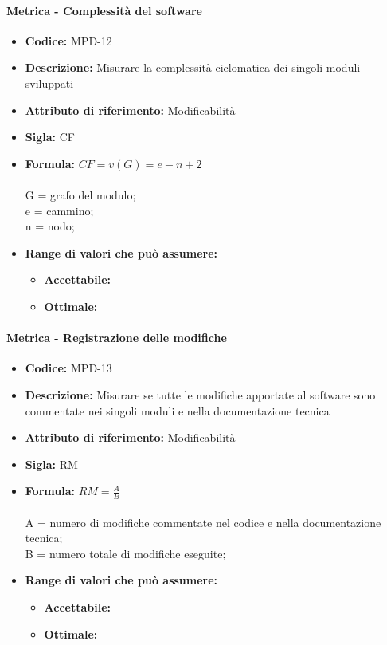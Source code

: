            \paragraph{Metrica - Complessità del software} 
              \begin{itemize}
         \item   \textbf{Codice:} MPD-12
         \item   \textbf{Descrizione:} Misurare la complessità ciclomatica dei singoli moduli sviluppati
          \item  \textbf{Attributo di riferimento:} Modificabilità
          \item  \textbf{Sigla:} CF
         \item   \textbf{Formula:} \begin{math}CF = v(G) = e - n + 2 \end{math}\\ \\
            G = grafo del modulo;\\
            e = cammino;\\
            n = nodo; 
               \item \textbf{Range di valori che può assumere:}
        \begin{itemize}
            \item \textbf{Accettabile:} 
            \item \textbf{Ottimale:} 
        \end{itemize}
       \end{itemize}
              

\paragraph{Metrica - Registrazione delle modifiche} 
   \begin{itemize}
          \item  \textbf{Codice:} MPD-13
         \item   \textbf{Descrizione:} Misurare se tutte le modifiche apportate al software sono commentate nei singoli moduli e nella documentazione tecnica
         \item   \textbf{Attributo di riferimento:} Modificabilità
         \item   \textbf{Sigla:} RM
         \item   \textbf{Formula:} \begin{math}RM = \frac{A}{B}\end{math}\\ \\
            A = numero di modifiche commentate nel codice e nella documentazione tecnica;\\
            B = numero totale di modifiche eseguite;
               \item \textbf{Range di valori che può assumere:}
        \begin{itemize}
            \item \textbf{Accettabile:} 
            \item \textbf{Ottimale:} 
        \end{itemize}
       \end{itemize}
              
